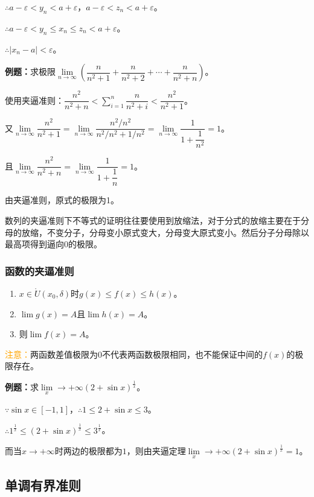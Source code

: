 \documentclass[UTF8, 12pt]{ctexart}
\begin{document}
$\therefore a-\varepsilon<y_n<a+\varepsilon$，$a-\varepsilon<z_n<a+\varepsilon$。

$\therefore a-\varepsilon<y_n\leqslant x_n\leqslant z_n<a+\varepsilon$。

$\therefore\vert x_n-a\vert<\varepsilon$。

\textbf{例题：}求极限$\lim\limits_{n\to\infty}\left(\dfrac{n}{n^2+1}+\dfrac{n}{n^2+2}+\cdots+\dfrac{n}{n^2+n}\right)$。

使用夹逼准则：$\dfrac{n^2}{n^2+n}<\sum_{i=1}^n\dfrac{n}{n^2+i}<\dfrac{n^2}{n^2+1}$。

又$\lim\limits_{n\to\infty}\dfrac{n^2}{n^2+1}=\lim\limits_{n\to\infty}\dfrac{n^2/n^2}{n^2/n^2+1/n^2}=\lim\limits_{n\to\infty}\dfrac{1}{1+\dfrac{1}{n^2}}=1$。

且$\lim\limits_{n\to\infty}\dfrac{n^2}{n^2+n}=\lim\limits_{n\to\infty}\dfrac{1}{1+\dfrac{1}{n}}=1$。

由夹逼准则，原式的极限为1。

数列的夹逼准则下不等式的证明往往要使用到放缩法，对于分式的放缩主要在于分母的放缩，不变分子，分母变小原式变大，分母变大原式变小。然后分子分母除以最高项得到逼向0的极限。

\subsubsection{函数的夹逼准则}

\begin{enumerate}
    \item $x\in\mathring{U}(x_0,\delta)$时$g(x)\leqslant f(x)\leqslant h(x)$。
    \item $\lim g(x)=A$且$\lim h(x)=A$。
    \item 则$\lim f(x)=A$。
\end{enumerate}

\textcolor{orange}{注意：}两函数差值极限为0不代表两函数极限相同，也不能保证中间的$f(x)$的极限存在。

\textbf{例题：}求$\lim\limits_x\to+\infty(2+\sin x)^{\frac{1}{x}}$。

$\because \sin x\in[-1,1]$，$\therefore 1\leqslant 2+\sin x\leqslant 3$。

$\therefore 1^{\frac{1}{x}}\leqslant\left(2+\sin x\right)^{\frac{1}{x}}\leqslant 3^{\frac{1}{x}}$。

而当$x\to+\infty$时两边的极限都为$1$，则由夹逼定理$\lim\limits_x\to+\infty(2+\sin x)^{\frac{1}{x}}=1$。

\subsection{单调有界准则}
\end{document}
